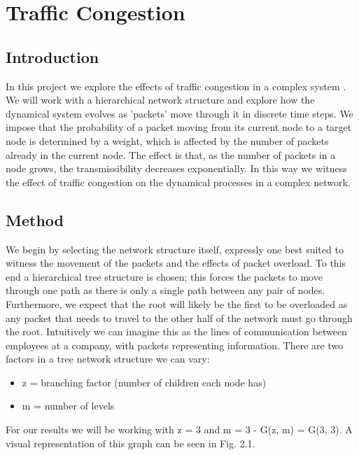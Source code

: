 \chapter{Traffic Congestion}




\section{Introduction}
    In this project we explore the effects of traffic congestion in a complex system \cite{Arenas2001} \cite{Echenique2004}. We will work with a hierarchical network structure and explore how the dynamical system evolves as 'packets' move through it in discrete time steps. We impose that the probability of a packet moving from its current node to a target node is determined by a weight, which is affected by the number of packets already in the current node. The effect is that, as the number of packets in a node grows, the transmissibility decreases exponentially. In this way we witness the effect of traffic congestion on the dynamical processes in a complex network.

\section{Method}

    We begin by selecting the network structure itself, expressly one best suited to witness the movement of the packets and the effects of packet overload. To this end a hierarchical tree structure is chosen; this forces the packets to move through one path as there is only a single path between any pair of nodes. Furthermore, we expect that the root will likely be the first to be overloaded as any packet that needs to travel to the other half of the network must go through the root. Intuitively we can imagine this as the lines of communication between employees at a company, with packets representing information.
    There are two factors in a tree network structure we can vary:

\begin{itemize}
  \item z = branching factor (number of children each node has)
  \item m = number of levels 
\end{itemize}

For our results we will be working with z = 3 and m = 3 - G(z, m) = G(3, 3). A visual representation of this graph can be seen in Fig. 2.1.

